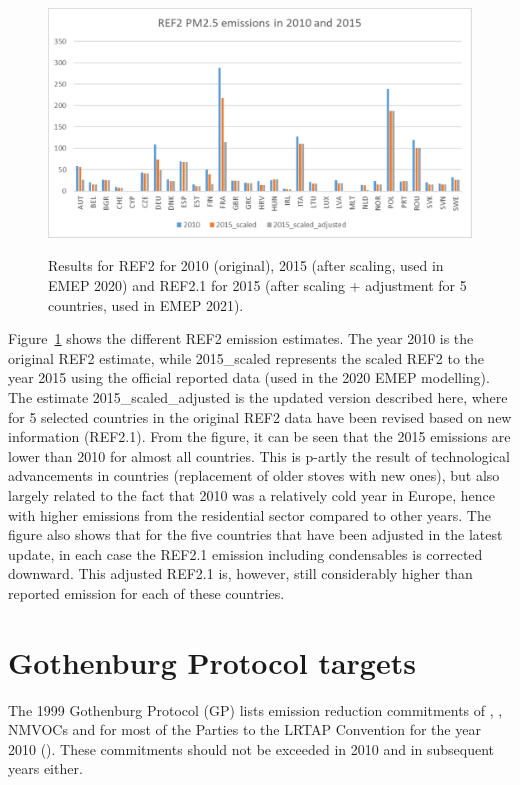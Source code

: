 \begin{figure}[h]
\centering
{\includegraphics*[viewport=1 1 740 400,clip,scale=0.45]{FIGS_CEIP/Fig3.pdf}}
\caption{Results for REF2 for 2010 (original), 2015 (after scaling, used in EMEP 2020) and REF2.1 for 2015 (after scaling + adjustment for 5 countries, used in EMEP 2021).}
\label{fig:CEIP3}
\end{figure}


Figure~\ref{fig:CEIP3} shows the different REF2 emission estimates. The year 2010 is the original REF2 estimate, while 2015\_scaled represents the scaled REF2 to the year 2015 using the official reported data (used in the 2020 EMEP modelling). The estimate 2015\_scaled\_adjusted is the updated version described here, where for 5 selected countries in the original REF2 data have been revised based on new information (REF2.1).
From the figure, it can be seen that the 2015 emissions are lower than 2010 for almost all countries. This is p-artly the result of technological advancements in countries (replacement of older stoves with new ones), but also largely related to the fact that 2010 was a relatively cold year in Europe, hence with higher emissions from the residential sector compared to other years. The figure also shows that for the five countries that have been adjusted in the latest update, in each case the REF2.1 emission including condensables is corrected downward. This adjusted REF2.1 is, however, still considerably higher than reported emission for each of these countries.

\section{Gothenburg Protocol targets}
\label{sec:GP}

The 1999 Gothenburg Protocol (GP) lists emission reduction commitments of  \nox,
\sox, NMVOCs and \nhiii for most of the Parties to the LRTAP Convention for the year 2010 (\cite{UNECE1999}). These commitments should not be exceeded in 2010 and in subsequent years either.

